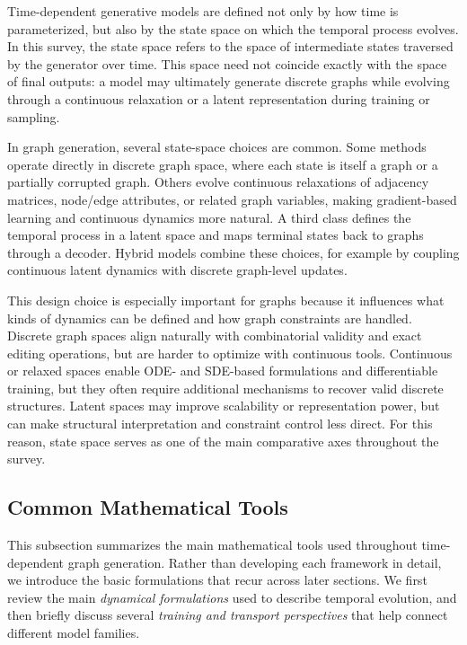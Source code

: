\documentclass{article}
\begin{document}
Time-dependent generative models are defined not only by how time is parameterized, but also by the
state space on which the temporal process evolves. In this survey, the state space refers to the space
of intermediate states traversed by the generator over time. This space need not coincide exactly
with the space of final outputs: a model may ultimately generate discrete graphs while evolving
through a continuous relaxation or a latent representation during training or sampling.

In graph generation, several state-space choices are common. Some methods operate directly in
discrete graph space, where each state is itself a graph or a partially corrupted graph. Others evolve
continuous relaxations of adjacency matrices, node/edge attributes, or related graph variables, making
gradient-based learning and continuous dynamics more natural. A third class defines the temporal
process in a latent space and maps terminal states back to graphs through a decoder. Hybrid models
combine these choices, for example by coupling continuous latent dynamics with discrete graph-level
updates.

This design choice is especially important for graphs because it influences what kinds of dynamics can
be defined and how graph constraints are handled. Discrete graph spaces align naturally with
combinatorial validity and exact editing operations, but are harder to optimize with continuous tools.
Continuous or relaxed spaces enable ODE- and SDE-based formulations and differentiable training,
but they often require additional mechanisms to recover valid discrete structures. Latent spaces may
improve scalability or representation power, but can make structural interpretation and constraint
control less direct. For this reason, state space serves as one of the main comparative axes throughout
the survey.




\subsection{Common Mathematical Tools}
\label{sec:math_tools}

This subsection summarizes the main mathematical tools used throughout time-dependent graph generation. Rather than developing each framework in detail, we introduce the basic formulations that recur across later sections. We first review the main \emph{dynamical formulations} used to describe temporal evolution, and then briefly discuss several \emph{training and transport perspectives} that help connect different model families.
\end{document}
